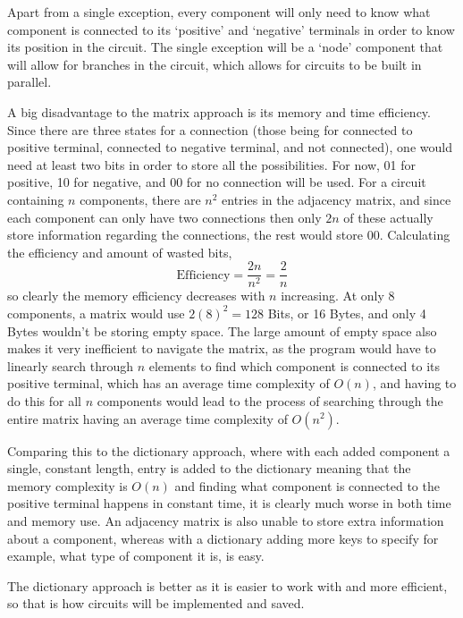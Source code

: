         Apart from a single exception, every component will only need to know what component is connected to its `positive' and `negative' terminals in order to know its position in the circuit. 
        The single exception will be a `node' component that will allow for branches in the circuit, which allows for circuits to be built in parallel. 

        A big disadvantage to the matrix approach is its memory and time efficiency. 
        Since there are three states for a connection (those being for connected to positive terminal, connected to negative terminal, and not connected), one would need at least two bits in order to store all the possibilities. 
        For now, 01 for positive, 10 for negative, and 00 for no connection will be used. 
        For a circuit containing \(n \) components, there are \(n^2\) entries in the adjacency matrix, and since each component can only have two connections then only \(2n\) of these actually store information regarding the connections, the rest would store 00. 
        Calculating the efficiency and amount of wasted bits,
        \[ \text{Efficiency} = \frac{2n}{n^2} = \frac{2}{n } \]
        so clearly the memory efficiency decreases with \(n\) increasing. 
        At only 8 components, a matrix would use \(2(8)^2 = 128\) Bits, or 16 Bytes, and only 4 Bytes wouldn't be storing empty space. 
        The large amount of empty space also makes it very inefficient to navigate the matrix, as the program would have to linearly search through \(n \) elements to find which component is connected to its positive terminal, which has an average time complexity of \(O(n)\), and having to do this for all \(n \) components would lead to the process of searching through the entire matrix having an average time complexity of \(O(n^2)\). 

        Comparing this to the dictionary approach, where with each added component a single, constant length, entry is added to the dictionary meaning that the memory complexity is \(O(n )\) and finding what component is connected to the positive terminal happens in constant time, it is clearly much worse in both time and memory use. 
        An adjacency matrix is also unable to store extra information about a component, whereas with a dictionary adding more keys to specify for example, what type of component it is, is easy.

        The dictionary approach is better as it is easier to work with and more efficient, so that is how circuits will be implemented and saved. 

